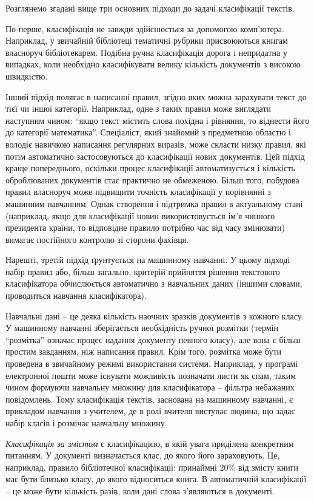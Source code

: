 Розглянемо згадані вище три основних підходи до задачі класифікації текстів.

По-перше, класифікація не завжди здійснюється за допомогою комп'ютера. Наприклад, у звичайній бібліотеці тематичні рубрики присвоюються книгам власноруч бібліотекарем. Подібна ручна класифікація дорога і непридатна у випадках, коли необхідно класифікувати велику кількість документів з високою швидкістю.

Інший підхід полягає в написанні правил, згідно яких можна зарахувати текст до тієї чи іншої категорії. Наприклад, одне з таких правил може виглядати наступним чином: “якщо текст містить слова похідна і рівняння, то віднести його до категорії математика”. Спеціаліст, який знайомий з предметною областю і володіє навичкою написання регулярних виразів, може скласти низку правил, які потім автоматично застосовуються до класифікації нових документів. Цей підхід краще попереднього, оскільки процес класифікації автоматизується і кількість оброблюваних документів стає практично не обмеженою. Більш того, побудова правил власноруч може підвищити точність класифікації у порівнянні з машинним навчанням. Однак створення і підтримка правил в актуальному стані (наприклад, якщо для класифікації новин використовується ім'я чинного президента країни, то відповідне правило потрібно час від часу змінювати) вимагає постійного контролю зі сторони фахівця.

Нарешті, третій підхід ґрунтується на машинному навчанні. У цьому підході набір правил або, більш загально, критерій прийняття рішення текстового класифікатора обчислюється автоматично з навчальних даних (іншими словами, проводиться навчання класифікатора).

Навчальні дані – це деяка кількість наочних зразків документів з кожного класу. У машинному навчанні зберігається необхідність ручної розмітки (термін “розмітка” означає процес надання документу певного класу), але вона є більш простим завданням, ніж написання правил. Крім того, розмітка може бути проведена в звичайному режимі використання системи. Наприклад, у програмі електронної пошти може існувати можливість позначати листи як спам, таким чином формуючи навчальну множину для класифікатора – фільтра небажаних повідомлень. Тому класифікація текстів, заснована на машинному навчанні, є прикладом навчання з учителем, де в ролі вчителя виступає людина, що задає набір класів і розмічає навчальну множину.

\textit{Класифікація за змістом} є класифікацією, в якій увага приділена конкретним питанням. У документі визначається клас, до якого його зараховують. Це, наприклад, правило бібліотечної класифікації: принаймні 20\% від змісту книги має бути близько класу, до якого відноситься книга. В автоматичній класифікації – це може бути кількість разів, коли дані слова з'являються в документі.

